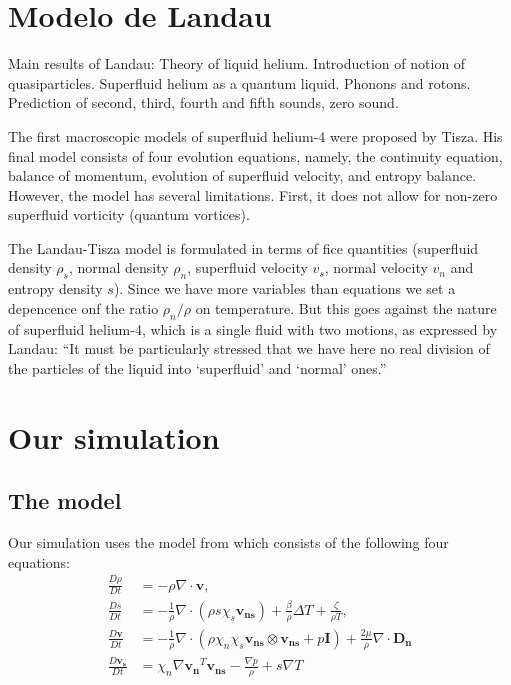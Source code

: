 \documentclass{article}
\begin{document}
\section{Modelo de Landau}
\cite{Kincl}
Main results of Landau:
Theory of liquid helium. Introduction of notion of quasiparticles. Superfluid
helium as a quantum liquid. Phonons and rotons. Prediction of second, third,
fourth and fifth sounds, zero sound.

\cite{PhysRev.60.356}

The first macroscopic models of superfluid helium-4 were
proposed by Tisza. His final model consists of four evolution equations, namely, the continuity equation, balance of momentum, evolution of superfluid velocity, and entropy balance. However, the model has several limitations. First, it does not allow for non-zero superfluid vorticity (quantum vortices). 

The Landau-Tisza model is formulated in terms of fice quantities (superfluid density $\rho_s$, normal density $\rho_n$, superfluid velocity $v_s$, normal velocity $v_n$ and entropy density $s$). Since we have more variables than equations we set a depencence onf the ratio $\rho_n/\rho$ on temperature. But this goes against the nature of superfluid helium-4, which is a single fluid with two motions, as expressed by Landau: ``It must be particularly stressed that we
have here no real division of the particles of the liquid into `superfluid'
and `normal' ones.''

\section{Our simulation}
\subsection{The model}
Our simulation uses the model from\cite{Kincl} which consists of the following four equations:
\begin{align}
\frac{D\rho}{Dt} &= -\rho \nabla \cdot \mathbf{v}, \\
\frac{Ds}{Dt} &= -\frac{1}{\rho} \nabla \cdot (\rho s \chi_s \mathbf{v_{ns}}) + \frac{\beta}{\rho} \Delta T + \frac{\zeta}{\rho T} ,\\
\frac{D\mathbf{v}}{Dt} &= -\frac{1}{\rho} \nabla \cdot (\rho \chi_n \chi_s \mathbf{v_{ns}} \otimes \mathbf{v_{ns}} + p \mathbf{I}) + \frac{2 \mu}{\rho} \nabla \cdot \mathbf{D_n} \\
\frac{D\mathbf{v_s}}{Dt} &= \chi_n \nabla \mathbf{v_n}^T \mathbf{v_{ns}} - \frac{\nabla p}{\rho} + s \nabla T
\end{align}
\end{document}
